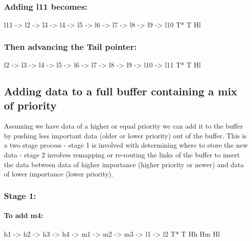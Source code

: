 \subsubsection*{Adding l11 becomes\+:}


\begin{DoxyCode}
l11 ->  l2  ->  l3  ->  l4  ->   l5  ->  l6  ->  l7  ->  l8  ->  l9  ->  l10
T*                                                                       T
                                                                         Hl
\end{DoxyCode}
 \subsubsection*{Then advancing the Tail pointer\+:}


\begin{DoxyCode}
l2  ->  l3  ->  l4  ->   l5  ->  l6  ->  l7  ->  l8  ->  l9  ->  l10  ->  l11
T*                                                                        T
                                                                          Hl
\end{DoxyCode}


\subsection*{Adding data to a full buffer containing a mix of priority}

Assuming we have data of a higher or equal priority we can add it to the buffer by pushing less important data (older or lower priority) out of the buffer. This is a two stage process -\/ stage 1 is involved with determining where to store the new data -\/ stage 2 involves remapping or re-\/routing the links of the buffer to insert the data between data of higher importance (higher priority or newer) and data of lower importance (lower priority).

\subsubsection*{Stage 1\+:}

\paragraph*{To add m4\+:}


\begin{DoxyCode}
h1  ->  h2  ->  h3  ->  h4  ->   m1  ->  m2  ->  m3  ->  l1  ->  l2
T*                                                               T
                        Hh                       Hm              Hl
\end{DoxyCode}


